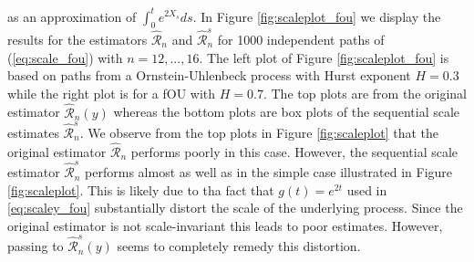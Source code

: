 \documentclass{article}
\begin{document}
as an approximation of $\int_0^t e^{2X_s} ds$. In Figure \ref{fig:scaleplot_fou} we display the results for the estimators $\hat{\mathscr{R}}_n$ and $\hat{\mathscr{R}}_n^s$ for 1000 independent paths of (\ref{eq:scale_fou}) with $n = 12,...,16$. The left plot of Figure \ref{fig:scaleplot_fou} is based on paths from a Ornstein-Uhlenbeck process with Hurst exponent $H=0.3$ while the right plot is for a fOU with $H=0.7$. The top plots are from the original estimator $\hat{\mathscr{R}}_n (y)$ whereas the bottom plots are box plots of the sequential scale estimates $\hat{\mathscr{R}}_n^s$. We observe from the top plots in Figure \ref{fig:scaleplot} that the original estimator $\hat{\mathscr{R}}_n$ performs poorly in this case. However, the sequential scale estimator $\hat{\mathscr{R}}_n^s$ performs almost as well as in the simple case illustrated in Figure \ref{fig:scaleplot}. This is likely due to tha fact that $g(t)=e^{2t}$ used in \eqref{eq:scaley_fou} substantially distort the scale of the underlying process. Since the original estimator is not scale-invariant this leads to poor estimates. However, passing to $\hat{\mathscr{R}}_n^s (y)$ seems to completely remedy this distortion. 
\end{document}
